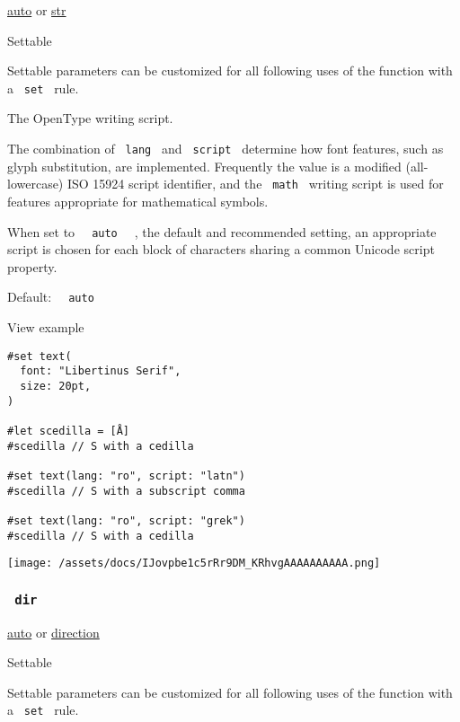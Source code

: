 \href{/docs/reference/foundations/auto/}{auto} {or}
\href{/docs/reference/foundations/str/}{str}

{{ Settable }}

\label{parameters-script-settable-tooltip}
Settable parameters can be customized for all following uses of the
function with a \texttt{\ set\ } rule.

The OpenType writing script.

The combination of \texttt{\ lang\ } and \texttt{\ script\ } determine
how font features, such as glyph substitution, are implemented.
Frequently the value is a modified (all-lowercase) ISO 15924 script
identifier, and the \texttt{\ math\ } writing script is used for
features appropriate for mathematical symbols.

When set to \texttt{\ }{\texttt{\ auto\ }}\texttt{\ } , the default and
recommended setting, an appropriate script is chosen for each block of
characters sharing a common Unicode script property.

Default: \texttt{\ }{\texttt{\ auto\ }}\texttt{\ }


View example

\begin{verbatim}
#set text(
  font: "Libertinus Serif",
  size: 20pt,
)

#let scedilla = [Å]
#scedilla // S with a cedilla

#set text(lang: "ro", script: "latn")
#scedilla // S with a subscript comma

#set text(lang: "ro", script: "grek")
#scedilla // S with a cedilla
\end{verbatim}

\texttt{[image: /assets/docs/IJovpbe1c5rRr9DM\_KRhvgAAAAAAAAAA.png]}

\subsubsection{\texorpdfstring{\texttt{\ dir\ }}{ dir }}\label{parameters-dir}

\href{/docs/reference/foundations/auto/}{auto} {or}
\href{/docs/reference/layout/direction/}{direction}

{{ Settable }}

\label{parameters-dir-settable-tooltip}
Settable parameters can be customized for all following uses of the
function with a \texttt{\ set\ } rule.

